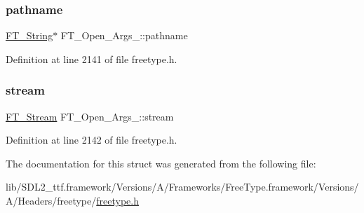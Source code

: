 \subsubsection{\texorpdfstring{pathname}{pathname}}
{\footnotesize\ttfamily \mbox{\hyperlink{fttypes_8h_a9846214585359eb2ba6bbb0e6de30639}{F\+T\+\_\+\+String}}$\ast$ F\+T\+\_\+\+Open\+\_\+\+Args\+\_\+\+::pathname}



Definition at line 2141 of file freetype.\+h.

\mbox{\label{struct_f_t___open___args___ae1e6444bf0c21b323ce6cbe8bc475b2b}} 
\subsubsection{\texorpdfstring{stream}{stream}}
{\footnotesize\ttfamily \mbox{\hyperlink{ftsystem_8h_a788b32c932932f7411a8dfa7f6c794bf}{F\+T\+\_\+\+Stream}} F\+T\+\_\+\+Open\+\_\+\+Args\+\_\+\+::stream}



Definition at line 2142 of file freetype.\+h.



The documentation for this struct was generated from the following file\+:\begin{DoxyCompactItemize}
\item 
lib/\+S\+D\+L2\+\_\+ttf.\+framework/\+Versions/\+A/\+Frameworks/\+Free\+Type.\+framework/\+Versions/\+A/\+Headers/freetype/\mbox{\hyperlink{freetype_8h}{freetype.\+h}}\end{DoxyCompactItemize}
